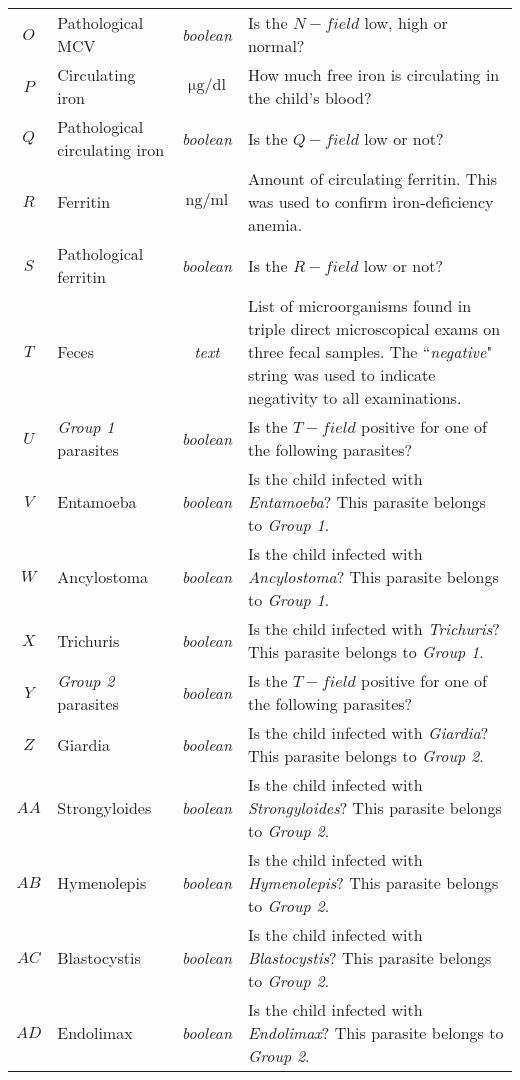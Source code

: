 \begin{footnotesize}
\begin{longtable}{C{.09\mylength} p{.25\mylength} C{.20\mylength} p{.40\mylength}}
	$O$ & Pathological MCV & \textit{boolean} & Is the $N-field$ low, high or normal?\\
	$P$ & Circulating iron & $\si{\micro\gram}/\si{\deci\litre}$ & How much free iron is circulating in the child's blood?\\
	$Q$ & Pathological circulating iron & \textit{boolean} & Is the $Q-field$ low or not?\\
	$R$ & Ferritin & $\si{\nano\gram}/\si{\milli\litre}$ & Amount of circulating ferritin. This was used to confirm iron-deficiency anemia.\\
	$S$ & Pathological ferritin & \textit{boolean} & Is the $R-field$ low or not?\\
	$T$ & Feces & \textit{text} & List of microorganisms found in triple direct microscopical exams on three fecal samples. The ``\textit{negative}" string was used to indicate negativity to all examinations.\\
	$U$ & \textit{Group 1} parasites & \textit{boolean} & Is the $T-field$ positive for one of the following parasites?\\
	$V$ & Entamoeba & \textit{boolean} & Is the child infected with \textit{Entamoeba}? This parasite belongs to \textit{Group 1}.\\
	$W$ & Ancylostoma & \textit{boolean} & Is the child infected with \textit{Ancylostoma}? This parasite belongs to \textit{Group 1}.\\
	$X$ & Trichuris & \textit{boolean} & Is the child infected with \textit{Trichuris}? This parasite belongs to \textit{Group 1}.\\
	$Y$ & \textit{Group 2} parasites & \textit{boolean} & Is the $T-field$ positive for one of the following parasites?\\
	$Z$ & Giardia & \textit{boolean} & Is the child infected with \textit{Giardia}? This parasite belongs to \textit{Group 2}.\\
	$AA$ & Strongyloides & \textit{boolean} & Is the child infected with \textit{Strongyloides}? This parasite belongs to \textit{Group 2}.\\
	$AB$ & Hymenolepis & \textit{boolean} & Is the child infected with \textit{Hymenolepis}? This parasite belongs to \textit{Group 2}.\\
	$AC$ &  Blastocystis & \textit{boolean} & Is the child infected with \textit{Blastocystis}? This parasite belongs to \textit{Group 2}.\\
	$AD$ & Endolimax & \textit{boolean} & Is the child infected with \textit{Endolimax}? This parasite belongs to \textit{Group 2}.\\

\end{longtable}
\end{footnotesize}

